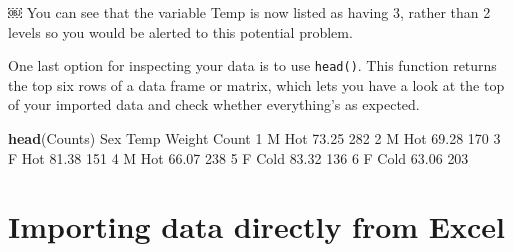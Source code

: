 \documentclass[
]{book}
\newenvironment{Shaded}{\begin{snugshade}}{\end{snugshade}}
\newcommand{\DecValTok}[1]{\textcolor[rgb]{0.00,0.00,0.81}{#1}}
\newcommand{\ErrorTok}[1]{\textcolor[rgb]{0.64,0.00,0.00}{\textbf{#1}}}
\newcommand{\FloatTok}[1]{\textcolor[rgb]{0.00,0.00,0.81}{#1}}
\newcommand{\KeywordTok}[1]{\textcolor[rgb]{0.13,0.29,0.53}{\textbf{#1}}}
\newcommand{\NormalTok}[1]{#1}
\newcommand{\OperatorTok}[1]{\textcolor[rgb]{0.81,0.36,0.00}{\textbf{#1}}}
\newcommand{\StringTok}[1]{\textcolor[rgb]{0.31,0.60,0.02}{#1}}
\begin{document}
\begin{Shaded}
\end{Shaded}

￼
You can see that the variable Temp is now listed as having 3, rather than 2 levels so you would be alerted to this potential problem.

One last option for inspecting your data is to use \texttt{head()}. This function returns the top six rows of a data frame or matrix, which lets you have a look at the top of your imported data and check whether everything's as expected.

\begin{Shaded}
\begin{Highlighting}[]
\KeywordTok{head}\NormalTok{(Counts)}
\NormalTok{  Sex   Temp Weight Count}
\DecValTok{1}\NormalTok{   M  Hot    }\FloatTok{73.25}   \DecValTok{282}
\DecValTok{2}\NormalTok{   M  Hot    }\FloatTok{69.28}   \DecValTok{170}
\DecValTok{3}\NormalTok{   F  Hot    }\FloatTok{81.38}   \DecValTok{151}
\DecValTok{4}\NormalTok{   M  Hot    }\FloatTok{66.07}   \DecValTok{238}
\DecValTok{5}\NormalTok{   F Cold    }\FloatTok{83.32}   \DecValTok{136}
\DecValTok{6}\NormalTok{   F Cold    }\FloatTok{63.06}   \DecValTok{203}
\end{Highlighting}
\end{Shaded}

\hypertarget{importing-data-directly-from-excel}{%
\section{Importing data directly from Excel}\label{importing-data-directly-from-excel}}
\end{document}
